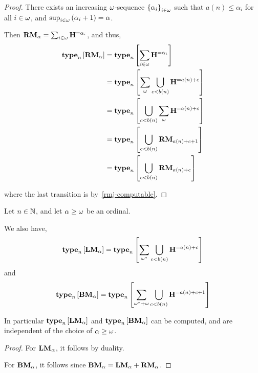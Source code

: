 \begin{proof}
    There exists an increasing $\omega$-sequence $\left\{ {\alpha_i} \right\}_{i \in \omega}$ such that
    $a(n) \le \alpha_i$ for all $i \in \omega$,
    and $\sup_{i \in \omega} \left( {\alpha_i + 1} \right) = \alpha$.

    Then $\mathbf{RM}_{\alpha} = \sum_{i \in \omega} \mathbf{H}^{= \alpha_i}$,
    and thus,
    \begin{align*}
        \mathbf{type}_{n} \left[ {\mathbf{RM}_{\alpha}} \right]
         & = \mathbf{type}_{n} \left[ {\sum_{i \in \omega} \mathbf{H}^{= \alpha_i}} \right]               \\
         & = \mathbf{type}_{n} \left[ {\sum_{\omega} \bigcup_{c < b(n)}{\mathbf{H}^{= a(n) + c}}} \right] \\
         & = \mathbf{type}_{n} \left[ {\bigcup_{c < b(n)}{\sum_{\omega} \mathbf{H}^{= a(n) + c}}} \right] \\
         & = \mathbf{type}_{n} \left[ {\bigcup_{c < b(n)}{\mathbf{RM}_{a(n) + c + 1}}} \right]         \\
         & = \mathbf{type}_{n} \left[ {\bigcup_{c < b(n)}{\mathbf{RM}_{a(n) + c}}} \right]             \\
    \end{align*}

    where the last transition is by~\cref{rmj-computable}.
\end{proof}

\begin{corollary}
    Let $n \in \mathbb{N}$, and let $\alpha \ge \omega$ be an ordinal.

    We also have,
    \[
        \mathbf{type}_{n} \left[ {\mathbf{LM}_{\alpha}} \right] = \mathbf{type}_{n} \left[ {\sum_{\omega^\ast} \bigcup_{c < b(n)}{\mathbf{H}^{= a(n) + c}}} \right]
    \]
    and
    \[
        \mathbf{type}_{n} \left[ {\mathbf{BM}_{\alpha}} \right] = \mathbf{type}_{n} \left[ {\sum_{\omega^\ast + \omega} \bigcup_{c < b(n)}{\mathbf{H}^{= a(n) + c + 1}}} \right]
    \]

    In particular $\mathbf{type}_{n} \left[ {\mathbf{LM}_{\alpha}} \right]$ and $\mathbf{type}_{n} \left[ {\mathbf{BM}_{\alpha}} \right]$ can be computed,
    and are independent of the choice of $\alpha \ge \omega$.
\end{corollary}

\begin{proof}
    For $\mathbf{LM}_{\alpha}$, it follows by duality.

    For $\mathbf{BM}_{\alpha}$, it follows since $\mathbf{BM}_{\alpha} = \mathbf{LM}_{\alpha} + \mathbf{RM}_{\alpha}$.
\end{proof}
